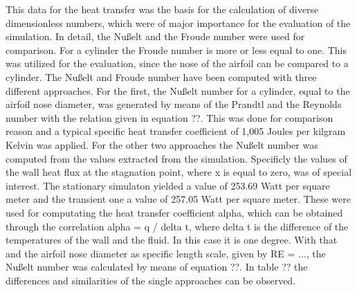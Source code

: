 This data for the heat transfer was the basis for the calculation of diverse dimensionless numbers, which were of major importance for the evaluation of the simulation.
In detail, the Nußelt and the Froude number were used for comparison. For a cylinder the Froude number is more or less equal to one. This was utilized for the evaluation, since the nose of the airfoil can be compared to a cylinder.
The Nußelt and Froude number have been computed with three different approaches. For the first, the Nußelt number for a cylinder, equal to the airfoil nose diameter, was generated by means of the Prandtl and the Reynolds number with the relation given in equation ??. This was done for comparison reason and a typical specific heat transfer coefficient of 1,005 Joules per kilgram Kelvin was applied.
For the other two approaches the Nußelt number was computed from the values extracted from the simulation. Specificly the values of the wall heat flux at the stagnation point, where x is equal to zero, was of special interest. The stationary simulaton yielded a value of 253.69 Watt per square meter and the transient one a value of 257.05 Watt per square meter. These were used  for computating the heat transfer coefficient alpha, which can be obtained through the correlation
alpha = q / delta t, 
where delta t is the difference of the temperatures of the wall and the fluid. In this case it is one degree. With that and the airfoil nose diameter as specific length scale, given by
RE = ...,
the Nußelt number was calculated by means of equation ??.
In table ?? the differences and similarities of the single approaches can be observed.

